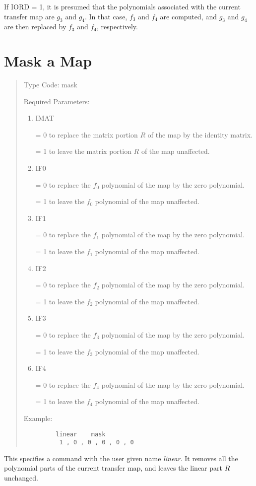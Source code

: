 If IORD = 1, it is presumed that the polynomials associated with the
current transfer map are $g_3$ and $g_4$.  In that case, $f_3$ and $f_4$
are computed, and $g_3$ and $g_4$ are then replaced by $f_3$ and $f_4$,
respectively.

\newpage
\section{Mask a Map}
\begin{quotation}
\noindent     Type Code:  mask
\vspace{5mm}

\noindent Required Parameters:
\begin{enumerate}

      \item  IMAT

             = 0 to replace the matrix portion $R$ of the map by the
			 identity
matrix.

             = 1 to leave the matrix portion $R$ of the map unaffected.

      \item  IF0

             = 0 to replace the $f_0$  polynomial of the map by the zero polynomial.

		= 1 to leave the $f_0$  polynomial of the map unaffected.

	  \item  IF1

             = 0 to replace the $f_1$  polynomial of the map by the zero polynomial.

             = 1 to leave the $f_1$  polynomial of the map unaffected.

      \item  IF2

             = 0 to replace the $f_2$  polynomial of the map by the zero
			   polynomial.

             = 1 to leave the $f_2$  polynomial of the map unaffected.

      \item  IF3

             = 0 to replace the $f_3$  polynomial of the map by the zero polynomial.

             = 1 to leave the $f_3$  polynomial of the map unaffected.

      \item  IF4

             = 0 to replace the $f_4$  polynomial of the map by the zero polynomial.

             = 1 to leave the $f_4$  polynomial of the map unaffected.
\end{enumerate}

\vspace{5mm}
\noindent Example:
\begin{verbatim}
         linear    mask
          1 , 0 , 0 , 0 , 0 , 0
\end{verbatim}
\end{quotation}
This specifies a command with the user given name {\em linear}.  It
removes all the
polynomial parts of the current transfer map, and
leaves the linear part $R$ unchanged.

